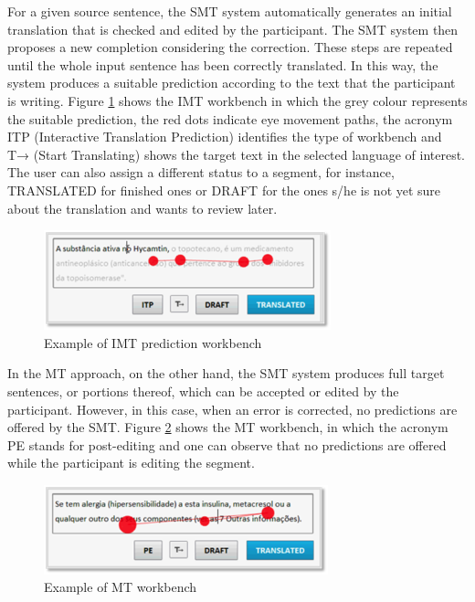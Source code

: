 \documentclass[output=paper]{langsci/langscibook}
\begin{document}
For a given source sentence, the SMT system automatically generates an initial translation that is checked and edited by the participant. The SMT system then proposes a new completion considering the correction. These steps are repeated until the whole input sentence has been correctly translated. In this way, the system produces a suitable prediction according to the text that the participant is writing. Figure \ref{sarto:fig:2} shows the IMT workbench in which the grey colour represents the suitable prediction, the red dots indicate eye movement paths, the acronym ITP (Interactive Translation Prediction) identifies the type of workbench and T→ (Start Translating) shows the target text in the selected language of interest. The user can also assign a different status to a segment, for instance, TRANSLATED for finished ones or DRAFT for the ones s/he is not yet sure about the translation and wants to review later.



\begin{figure}
 \includegraphics[width=\textwidth]{figures/Sarto2.png}
 \caption{Example of IMT prediction workbench}
 \label{sarto:fig:2}
\end{figure} 


In the MT approach, on the other hand, the SMT system produces full target sentences, or portions thereof, which can be accepted or edited by the participant. However, in this case, when an error is corrected, no predictions are offered by the SMT. Figure  \ref{sarto:fig:3} shows the MT workbench, in which the acronym PE stands for post-editing and one can observe that no predictions are offered while the participant is editing the segment.  



  
\begin{figure}
 \includegraphics[width=\textwidth]{figures/Sarto3.png}
 \caption{Example of MT workbench}
 \label{sarto:fig:3}
\end{figure} 
 
\end{document}
